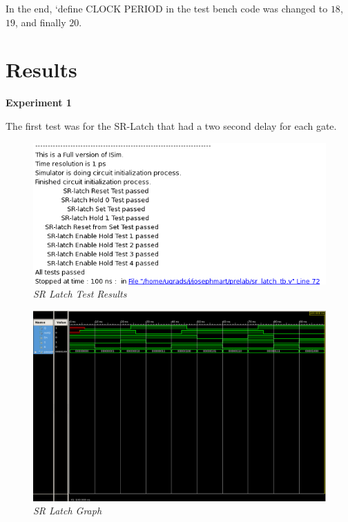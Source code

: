 \documentclass[a4paper,12pt]{article}
\begin{document}
  
  
  In the end, `define CLOCK PERIOD in the test bench code was changed to $18$, $19$, and finally
  $20$.

\section*{Results}
%
%
%

  \textbf{Experiment 1}
  
  The first test was for the SR-Latch that had a two second delay for each gate.
  
  \begin{figure}[h]
    \begin{center}
      \includegraphics[scale=0.7]{sr_latch_tests.png}
      \caption{\textit{SR Latch Test Results}}
    \end{center}
  \end{figure}
  \newpage
  \begin{figure}[h]
    \begin{center}
      \includegraphics[scale=0.3]{sr_latch_graph.png}
      \caption{\textit{SR Latch Graph}}
    \end{center}
  \end{figure}
  
\end{document}
